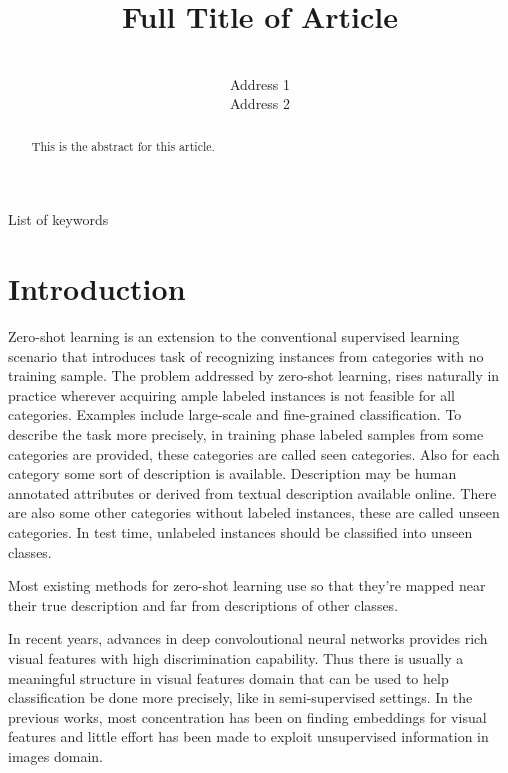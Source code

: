 \documentclass[wcp]{jmlr}
\title[Short Title]{Full Title of Article}
\author{\Name{Author Name1} \Email{abc@sample.com}\\
  \addr Address 1
  \AND
  \Name{Author Name2} \Email{xyz@sample.com}\\
  \addr Address 2
 }
\begin{document}
\maketitle

\begin{abstract}
This is the abstract for this article.
\end{abstract}
\begin{keywords}
List of keywords
\end{keywords}

\section{Introduction}
Zero-shot learning is an extension to the conventional supervised learning scenario
that introduces task of recognizing instances from categories with no training sample.
 The problem addressed by zero-shot learning, rises naturally in practice wherever acquiring ample labeled instances
 is not feasible for all categories. Examples include large-scale and fine-grained classification.
To describe the task more precisely, in training phase labeled samples from some categories are provided,
these categories are called seen categories. Also for each category some sort of description is available.
Description may be human annotated attributes or derived from textual description available online.
There are also some other categories without labeled instances, these are called unseen categories.
 In test time, unlabeled instances should be classified into unseen classes.

Most existing methods for zero-shot learning use 
so that they're mapped near their true description and far from descriptions of other classes.


 In recent years, advances in deep convoloutional neural networks provides rich visual features with high discrimination capability.
 Thus there is usually a meaningful structure in visual features domain
that can be used to help classification be done more precisely, like in semi-supervised settings.
 In the previous works, most concentration has been on finding embeddings for visual features and little effort has been made to exploit unsupervised information in images domain.
\end{document}
